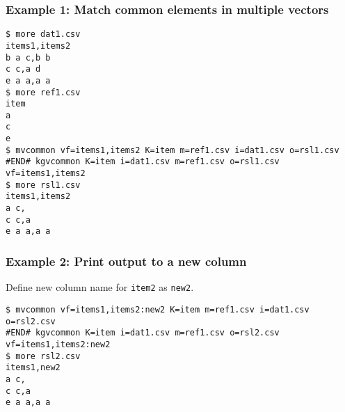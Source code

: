 \subsubsection*{Example 1: Match common elements in multiple vectors}



\begin{Verbatim}[baselinestretch=0.7,frame=single]
$ more dat1.csv
items1,items2
b a c,b b
c c,a d
e a a,a a
$ more ref1.csv
item
a
c
e
$ mvcommon vf=items1,items2 K=item m=ref1.csv i=dat1.csv o=rsl1.csv
#END# kgvcommon K=item i=dat1.csv m=ref1.csv o=rsl1.csv vf=items1,items2
$ more rsl1.csv
items1,items2
a c,
c c,a
e a a,a a
\end{Verbatim}
\subsubsection*{Example 2: Print output to a new column}

Define new column name for \verb|item2| as \verb|new2|.


\begin{Verbatim}[baselinestretch=0.7,frame=single]
$ mvcommon vf=items1,items2:new2 K=item m=ref1.csv i=dat1.csv o=rsl2.csv
#END# kgvcommon K=item i=dat1.csv m=ref1.csv o=rsl2.csv vf=items1,items2:new2
$ more rsl2.csv
items1,new2
a c,
c c,a
e a a,a a
\end{Verbatim}
